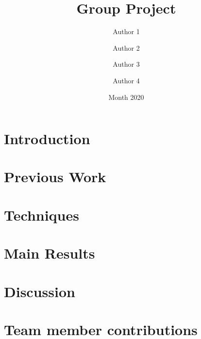\documentclass{article}
\title{Group Project}
\author{
    Author 1
    \and
    Author 2
    \and
    Author 3
    \and
    Author 4
}
\date{Month 2020}
\begin{document}
\maketitle

\section{Introduction}

\section{Previous Work}

\section{Techniques}

\section{Main Results}

\section{Discussion}

\section{Team member contributions}

\newpage


\end{document}
